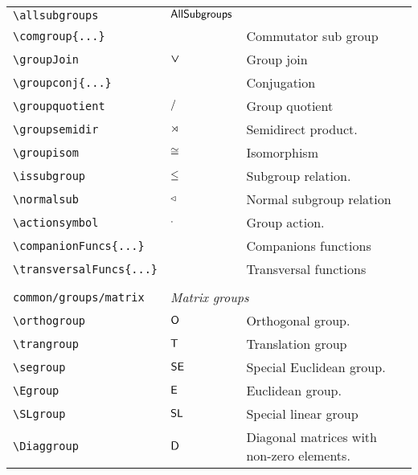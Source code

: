 \begin{longtable}{lll}
 {\color[rgb]{0.5,0.5,0.5}\texttt{\textbackslash allsubgroups}} & $\mathsf{AllSubgroups}$ & \\ 
 {\color[rgb]{0.5,0.5,0.5}\texttt{\textbackslash comgroup\{...\}}} &  &  Commutator sub group\\ 
 {\color[rgb]{0.5,0.5,0.5}\texttt{\textbackslash groupJoin}} & $\boldsymbol{\vee}$ &  Group join\\ 
 {\color[rgb]{0.5,0.5,0.5}\texttt{\textbackslash groupconj\{...\}}} &  &  Conjugation\\ 
 {\color[rgb]{0.5,0.5,0.5}\texttt{\textbackslash groupquotient}} & $\mathrel{/}$ &  Group quotient\\ 
 {\color[rgb]{0.5,0.5,0.5}\texttt{\textbackslash groupsemidir}} & $\mathrel{\rtimes}$ &  Semidirect product.\\ 
 {\color[rgb]{0.5,0.5,0.5}\texttt{\textbackslash groupisom}} & $\mathrel{\cong}$ &  Isomorphism\\ 
 {\color[rgb]{0.5,0.5,0.5}\texttt{\textbackslash issubgroup}} & $\mathrel{\leq}$ &  Subgroup relation.\\ 
 {\color[rgb]{0.5,0.5,0.5}\texttt{\textbackslash normalsub}} & $\mathrel{\triangleleft}$ &  Normal subgroup relation\\ 
 {\color[rgb]{0.5,0.5,0.5}\texttt{\textbackslash actionsymbol}} & $\mathrel{\cdot}$ &  Group action.\\ 
 {\color[rgb]{0.5,0.5,0.5}\texttt{\textbackslash companionFuncs\{...\}}} &  &  Companions functions\\ 
 {\color[rgb]{0.5,0.5,0.5}\texttt{\textbackslash transversalFuncs\{...\}}} &  &  Transversal functions\\ 
  &  & \\ 
 {\color[rgb]{0.5,0.5,0.5}\texttt{common/groups/matrix}} & \multicolumn{2}{l}{\emph{Matrix groups}}\\ 
 \hline
{\color[rgb]{0.5,0.5,0.5}\texttt{\textbackslash orthogroup}} & $\mathsf{O}$ &  Orthogonal group.\\ 
 {\color[rgb]{0.5,0.5,0.5}\texttt{\textbackslash trangroup}} & $\mathsf{T}$ &   Translation group\\ 
 {\color[rgb]{0.5,0.5,0.5}\texttt{\textbackslash segroup}} & $\mathsf{SE}$ &  Special Euclidean group.\\ 
 {\color[rgb]{0.5,0.5,0.5}\texttt{\textbackslash Egroup}} & $\mathsf{E}$ &   Euclidean group.\\ 
 {\color[rgb]{0.5,0.5,0.5}\texttt{\textbackslash SLgroup}} & $\mathsf{SL}$ &   Special linear group\\ 
 {\color[rgb]{0.5,0.5,0.5}\texttt{\textbackslash Diaggroup}} & $\mathsf{D}$ &   Diagonal matrices with non-zero elements.\\ 

\end{longtable}
